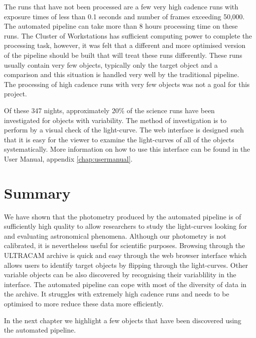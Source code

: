 The runs that have not been processed are a few very high cadence runs with exposure times of less than 0.1 seconds and number of frames exceeding 50,000. The automated pipeline can take more than 8 hours processing time on these runs. The Cluster of Workstations has sufficient computing power to complete the processing task, however, it was felt that a different  and more optimised version of the pipeline should be built that will treat these runs differently. These runs usually contain very few objects, typically only the target object and a comparison and this situation is handled very well by the traditional pipeline. The processing of high cadence runs with very few objects was not a goal for this project. 

Of these 347 nights, approximately 20\% of the science runs have been investigated for objects with variability. The method of investigation is to perform by a visual check of the light-curve. The web interface is designed such that it is easy for the viewer to examine the light-curves of all of the objects systematically. More information on how to use this interface can be found in the User Manual, appendix \ref{chap:usermanual}. 

\section{Summary}
We have shown that the photometry produced by the automated pipeline is of sufficiently high quality to allow researchers to study the light-curves looking for and evaluating astronomical phenomena. Although our photometry is not calibrated, it is nevertheless useful for scientific purposes. Browsing through the ULTRACAM archive is quick and easy through the web browser interface which allows users to identify target objects by flipping through the light-curves. Other variable objects can be also discovered by recognising their variablility in the interface. The automated pipeline can cope with most of the diversity of data in the archive. It struggles with extremely high cadence runs and needs to be optimised to more reduce these data more efficiently.

In the next chapter we highlight a few objects that have been discovered using the automated pipeline. 
